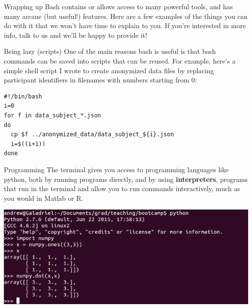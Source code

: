 \documentclass{beamer}
\begin{document}
\begin{frame}{Wrapping up}
Bash contains or allows access to many powerful tools, and has many arcane (but useful!) features. Here are a few examples of the things you can do with it that we won't have time to explain to you. If you're interested in more info, talk to us and we'll be happy to provide it!
\end{frame}

\begin{frame}[fragile]{Being lazy (scripts)}
One of the main reasons bash is useful is that bash commands can be saved into scripts that can be reused. For example, here's a simple shell script I wrote to create anonymized data files by replacing participant identifiers in filenames with numbers starting from 0:
\begin{lstlisting}
#!/bin/bash
i=0
for f in data_subject_*.json
do
  cp $f ../anonymized_data/data_subject_${i}.json
  i=$((i+1))
done
\end{lstlisting}
\end{frame}

\begin{frame}{Programming}
The terminal gives you access to programming languages like python, both by running programs directly, and by using \textbf{interpreters}, programs that run in the terminal and allow you to run commands interactively, much as you would in Matlab or R.
\begin{center}
\includegraphics[width = \textwidth]{images/python.png}
\end{center}
\end{frame}
\end{document}
